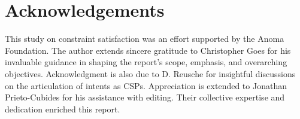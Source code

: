 \section{Acknowledgements}

This study on constraint satisfaction was an effort supported by the Anoma Foundation. The author extends sincere gratitude to Christopher Goes for his invaluable guidance in shaping the report's scope, emphasis, and overarching objectives. Acknowledgment is also due to D. Reusche for insightful discussions on the articulation of intents as CSPs. Appreciation is extended to Jonathan Prieto-Cubides for his assistance with editing. Their collective expertise and dedication enriched this report.
